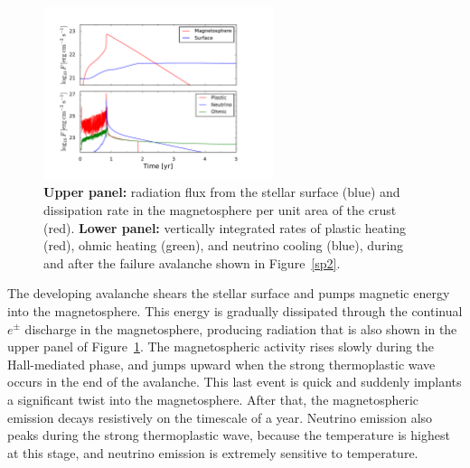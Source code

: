 \begin{figure}[htbp]
\centering
\includegraphics[width=0.6\textwidth]{pics/chap2/figz2.pdf} 
\caption[Radiation flux from the outburst simulation]{
\textbf{Upper panel:} radiation flux from the stellar surface (blue) and dissipation rate in the 
magnetosphere per unit area of the crust (red).
\textbf{Lower panel:} vertically integrated rates of plastic heating (red), ohmic heating 
(green), and neutrino cooling (blue), during and after the failure avalanche shown in 
Figure~\ref{sp2}.
}
\label{figz2}
\end{figure}

The developing avalanche shears the stellar surface and pumps magnetic energy into the magnetosphere. 
This energy is gradually dissipated through the continual $e^\pm$ discharge in the magnetosphere, producing radiation that is also shown in the upper panel of Figure~\ref{figz2}.
The magnetospheric activity rises slowly  during the Hall-mediated phase, and jumps upward when the strong thermoplastic wave occurs in the end of the avalanche.
This last event is quick and suddenly implants a significant twist into the magnetosphere.
After that, the magnetospheric emission decays resistively on the timescale of a year. 
Neutrino emission also peaks during the strong thermoplastic wave, because the temperature is highest at this stage, and neutrino emission is extremely sensitive to temperature.

